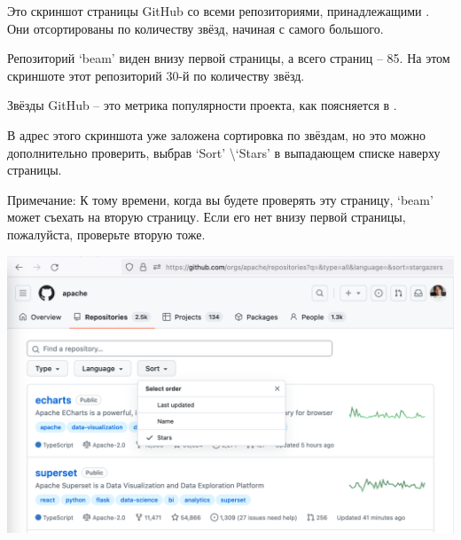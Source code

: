 
Это скриншот страницы GitHub со всеми репозиториями, принадлежащими \Asf.
Они отсортированы по количеству звёзд, начиная с самого большого.

Репозиторий `beam' виден внизу первой страницы, а всего страниц -- 85.
На этом скриншоте этот репозиторий 30-й по количеству звёзд.

Звёзды GitHub -- это метрика популярности проекта, как поясняется в .

В адрес этого скриншота уже заложена сортировка по звёздам,
но это можно дополнительно проверить, выбрав `Sort' \textbackslash `Stars'
в выпадающем списке наверху страницы.

Примечание: К тому времени, когда вы будете проверять эту страницу, `beam' может съехать на вторую страницу.
Если его нет внизу первой страницы, пожалуйста, проверьте вторую тоже.

\begin{center}
    \includegraphics[width=40em]{beam-github-stars-dropdown-p1}
\end{center}
\WillContinue
\pagebreak

